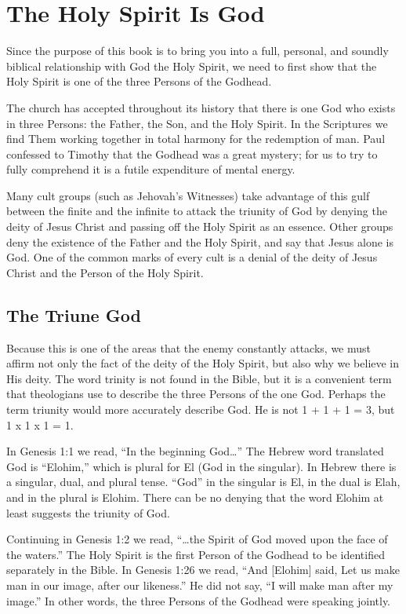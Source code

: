 \chapter{The Holy Spirit Is God}

Since the purpose of this book is to bring you into a full,
personal, and soundly biblical relationship with God the
Holy Spirit, we need to first show that the Holy Spirit is one
of the three Persons of the Godhead.

The church has accepted throughout its history that
there is one God who exists in three Persons: the Father, the
Son, and the Holy Spirit. In the Scriptures we find Them
working together in total harmony for the redemption of
man. Paul confessed to Timothy that the Godhead was a
great mystery; for us to try to fully comprehend it is a futile
expenditure of mental energy.

Many cult groups (such as Jehovah’s Witnesses) take
advantage of this gulf between the finite and the infinite
to attack the triunity of God by denying the deity of Jesus
Christ and passing off the Holy Spirit as an essence. Other
groups deny the existence of the Father and the Holy Spirit,
and say that Jesus alone is God. One of the common marks
of every cult is a denial of the deity of Jesus Christ and the
Person of the Holy Spirit.

\section*{The Triune God}

Because this is one of the areas that the enemy constantly
attacks, we must affirm not only the fact of the deity
of the Holy Spirit, but also why we believe in His deity. The
word trinity is not found in the Bible, but it is a convenient
term that theologians use to describe the three Persons of
the one God. Perhaps the term triunity would more accurately
describe God. He is not 1 + 1 + 1 = 3, but 1 x 1 x 1 =
1.

In Genesis 1:1 we read, “In the beginning God…” The
Hebrew word translated God is “Elohim,” which is plural for
El (God in the singular). In Hebrew there is a singular, dual,
and plural tense. “God” in the singular is El, in the dual is
Elah, and in the plural is Elohim. There can be no denying
that the word Elohim at least suggests the triunity of God.

Continuing in Genesis 1:2 we read, “…the Spirit of God
moved upon the face of the waters.” The Holy Spirit is the
first Person of the Godhead to be identified separately in the
Bible. In Genesis 1:26 we read, “And [Elohim] said, Let us
make man in our image, after our likeness.” He did not say,
“I will make man after my image.” In other words, the three
Persons of the Godhead were speaking jointly.



